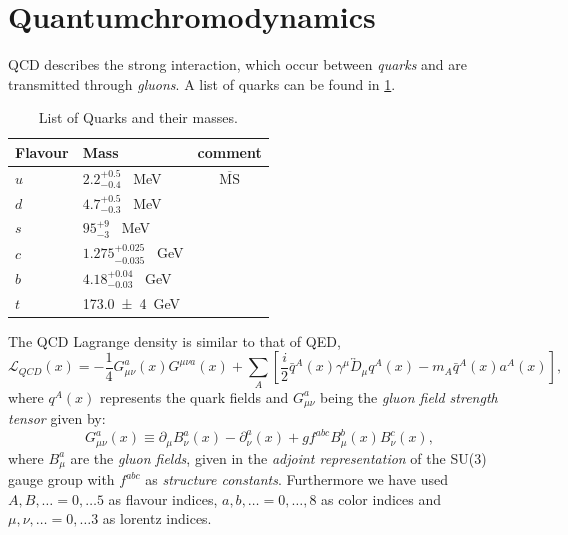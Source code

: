 \documentclass[../../index.tex]{subfiles}
\begin{document}
\section{Quantumchromodynamics}
\label{sec:quantumchromodynamics}
QCD describes the strong interaction, which occur between \textit{quarks} and
are transmitted through \textit{gluons}. A list of quarks can be found in
\ref{table:quarkList}.
\begin{table}
  \label{table:quarkList}
  \centering
  \begin{tabular}{l l c}
    \toprule
    Flavour & Mass & comment\\
    \midrule
    $u$ & $2.2_{-0.4}^{+0.5}$ \SI{}{\mega\eV} & $\overline{\text{MS}}$ \\
    $d$ & $4.7_{-0.3}^{+0.5}$ \SI{}{\mega\eV} \\
    $s$ & $95_{-3}^{+9}$ \SI{}{\mega\eV}  \\
    $c$ & $1.275_{-0.035}^{+0.025}$ \SI{}{\giga\eV} \\
    $b$ & $4.18_{-0.03}^{+0.04}$ \SI{}{\giga\eV} \\
    $t$ & \SI{173.0 \pm 4}{\giga\eV} \\
    \bottomrule 
  \end{tabular}
  \caption{List of Quarks and their masses\cite{PDG2018}.}
\end{table}

The QCD Lagrange density is similar to that of QED\cite{Jamin2006},
\begin{equation}
  \label{eq:qcdLagrangian}
  \mathcal{L}_{QCD}(x) = -\frac{1}{4}G_{\mu\nu}^a(x)G^{\mu\nu a}(x) + \sum_A \left[ \frac{i}{2} \bar{q}^A(x) \gamma^\mu \overleftrightarrow{D}_\mu q^A(x) - m_A\bar{q}^A(x) a^A(x) \right],
\end{equation}
where $q^A(x)$ represents the quark fields and $G_{\mu\nu}^a$ being the \textit{gluon field strength tensor} given by:
\begin{equation}
  \label{eq:gluonField}
  G_{\mu\nu}^a(x) \equiv \partial_\mu B_\nu^a(x) - \partial_\nu^a(x) + g f^{abc} B_\mu^b(x) B_\nu^c(x),
\end{equation}
where $B_\mu^a$ are the \textit{gluon fields}, given in the \textit{adjoint
  representation} of the SU(3) gauge group with $f^{abc}$ as \textit{structure
  constants}. Furthermore we have used $A, B, \dots = 0, \dots 5$ as flavour indices, $a,
b, \dots = 0, \dots, 8 $ as color indices and $\mu, \nu, \dots = 0, \dots 3$ as lorentz indices.
\end{document}
